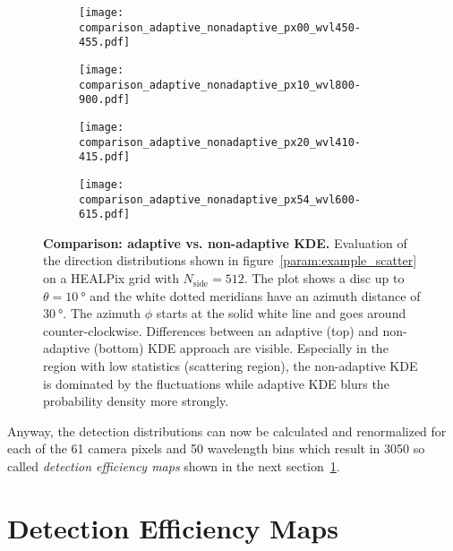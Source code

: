 \begin{figure}[H]
	\centering
	\begin{subfigure}[t]{0.40\textwidth}
		\texttt{[image: comparison\_adaptive\_nonadaptive\_px00\_wvl450-455.pdf]}
		\subcaption{}
		\label{param:kde_comparison:1}
	\end{subfigure}
	\hfill
	\begin{subfigure}[t]{0.40\textwidth}
		\texttt{[image: comparison\_adaptive\_nonadaptive\_px10\_wvl800-900.pdf]}
		\subcaption{}
		\label{param:kde_comparison:2}
	\end{subfigure}
	\vfill
	\begin{subfigure}[b]{0.40\textwidth}
		\texttt{[image: comparison\_adaptive\_nonadaptive\_px20\_wvl410-415.pdf]}
		\subcaption{}
		\label{param:kde_comparison:3}
	\end{subfigure}
	\hfill
	\begin{subfigure}[b]{0.40\textwidth}
		\texttt{[image: comparison\_adaptive\_nonadaptive\_px54\_wvl600-615.pdf]}
		\subcaption{}
		\label{param:kde_comparison:4}
	\end{subfigure}
	\caption[Comparison: adaptive vs. non-adaptive KDE]{\textbf{Comparison: adaptive vs. non-adaptive KDE.} Evaluation of the direction distributions shown in figure~\ref{param:example_scatter} on a HEALPix grid with $N_\text{side}=\num{512}$. The plot shows a disc up to $\theta=\SI{10}{\degree}$ and the white dotted meridians have an azimuth distance of $\SI{30}{\degree}$. The azimuth $\phi$ starts at the solid white line and goes around counter-clockwise. Differences between an adaptive (top) and non-adaptive (bottom) KDE approach are visible. Especially in the region with low statistics (scattering region), the non-adaptive KDE is dominated by the fluctuations while adaptive KDE blurs the probability density more strongly.}
	\label{param:kde_comparison}		
\end{figure}

Anyway, the detection distributions can now be calculated and renormalized for each of the \num{61} camera pixels and \num{50} wavelength bins which result in \num{3050} so called \textit{detection efficiency maps} shown in the next section~\ref{sec:deteff_maps}.

\section{Detection Efficiency Maps}\label{sec:deteff_maps}

